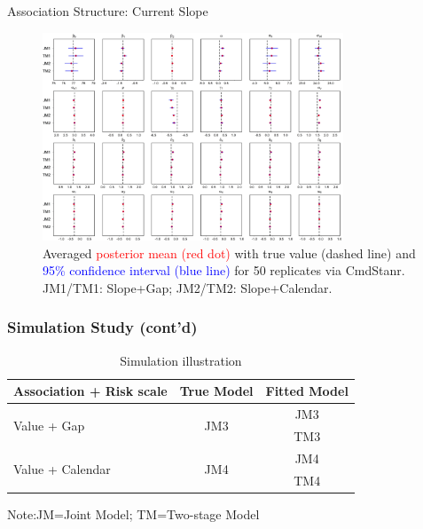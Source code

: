 \documentclass[fleqn]{beamer}
\begin{document}
\begin{frame}{Association Structure: Current Slope}
\begin{figure}[ht] 
        \includegraphics[width=0.8\textwidth]{Figures/Chp3_sim_1.jpg} 
        \caption{\tiny Averaged \textcolor{red}{posterior mean (red dot)} with true value (dashed line) and \textcolor{blue}{95\% confidence interval (blue line)} for 50 replicates via CmdStanr. JM1/TM1: Slope+Gap; JM2/TM2: Slope+Calendar.}
    \end{figure}

\end{frame}

\begin{frame}
\frametitle{Simulation Study (cont'd)}
\footnotesize
\begin{table}[H]
    \caption{\scriptsize Simulation illustration}
        \begin{threeparttable}
            \begin{tabular}{l|c|c}
            \toprule
        \bf Association + Risk scale & \bf True Model & \bf Fitted Model \\ \hline
        \multirow{2}{*}{Value + Gap} & \multirow{2}{*}{JM3} & JM3 \\ 
        && TM3\\\hline 
        \multirow{2}{*}{Value + Calendar} & \multirow{2}{*}{JM4} & JM4 \\ 
        && TM4\\
     \bottomrule
    \end{tabular}
    \begin{tablenotes}[para]
    \scriptsize
    Note:JM=Joint Model; TM=Two-stage Model
    \end{tablenotes}
    \end{threeparttable}
    \end{table}
\end{frame}
\end{document}
